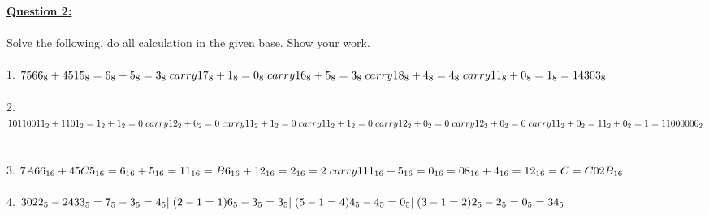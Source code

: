 \documentclass[11pt]{article}
\begin{document}
\noindent \textbf{\ul{Question 2:}} \\
\\
Solve the following, do all calculation in the given base. Show your work.\\
\\
1. $ 7566_{8} + 4515_{8} = \\
6_{8} + 5_{8} = 3_{8} \;carry 1\\ 
7_{8} + 1_{8} = 0_{8} \;carry 1\\
6_{8} + 5_{8} = 3_{8} \;carry 1\\
8_{8} + 4_{8} = 4_{8} \;carry 1\\
1_{8} + 0_{8} = 1_{8}\\
=14303_{8} $\\\\
2. $ 10110011_{2} + 1101_{2} = \\1_{2} + 1_{2} = 0 \; carry 1 \\
2_{2} + 0_{2} = 0 \; carry 1 \\
1_{2} + 1_{2} = 0 \; carry 1 \\
1_{2} + 1_{2} = 0 \; carry 1 \\
2_{2} + 0_{2} = 0 \; carry 1 \\
2_{2} + 0_{2} = 0 \; carry 1 \\
1_{2} + 0_{2} = 1 \\
1_{2} + 0_{2} = 1 \\
=11000000_{2}$\\\\
\\
3. $ 7A66_{16} + 45C5_{16} = \\
6_{16} + 5_{16} = 11_{16} = B \\
6_{16} + 12_{16} = 2_{16} = 2 \;carry 1\\
11_{16} + 5_{16} = 0_{16} = 0 \\
8_{16} + 4_{16} = 12_{16} = C \\
= C02B_{16} $\\
\\
4. $ 3022_{5} - 2433_{5} = \\
7_{5} - 3_{5} = 4_{5} | \;(2 - 1 = 1)\\
6_{5} - 3_{5} = 3_{5} |\;(5 - 1 = 4)\\
4_{5} - 4_{5} = 0_{5} |\;(3 - 1 = 2)\\
2_{5} - 2_{5} = 0_{5} \\
= 34_{5} $ \\
\\

\pagebreak
\end{document}
